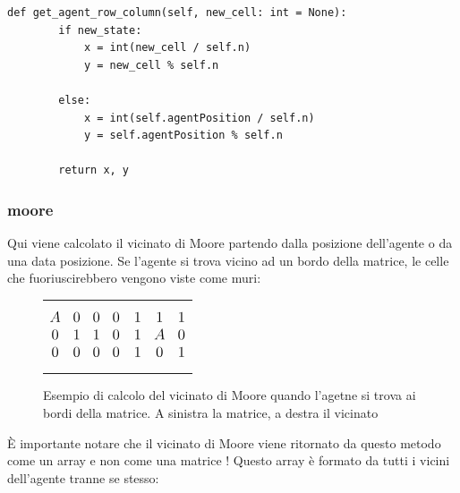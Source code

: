 \begin{lstlisting}[style=python, caption={Metodo che converte identificativo a corrdinate}]
	def get_agent_row_column(self, new_cell: int = None):
		if new_state:
			x = int(new_cell / self.n)
			y = new_cell % self.n
			
		else:
			x = int(self.agentPosition / self.n)
			y = self.agentPosition % self.n
	
		return x, y
\end{lstlisting}

\subsubsection{moore}
Qui viene calcolato il vicinato di Moore partendo dalla posizione dell'agente o da una data posizione.
Se l'agente si trova vicino ad un bordo della matrice, le celle che fuoriuscirebbero vengono viste come muri:
\begin{figure}[H]
	\begin{tabular}{m{20em} m{20em}}
		\begin{equation*}
			\large
			\begin{matrix}
				A & 0 & 0 & 0\\
				0 & 1 & 1 & 0\\
				0 & 0 & 0  & 0\\
			\end{matrix}
		\end{equation*}
		&
		\begin{equation*}
			\large
			\begin{matrix}
				1 & 1 & 1\\
				1 & A & 0\\
				1 & 0 & 1\\
			\end{matrix}
		\end{equation*}
	\end{tabular}
	\caption{Esempio di calcolo del vicinato di Moore quando l'agetne si trova ai bordi della matrice. A sinistra la matrice, a destra il vicinato}
\end{figure}

\`{E} importante notare che il vicinato di Moore viene ritornato da questo metodo come un array e non come una matrice ! Questo array \`{e} formato da tutti i vicini dell'agente tranne se stesso:

